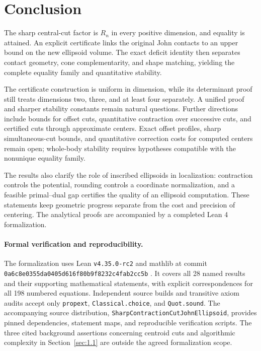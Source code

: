 \section{Conclusion}\label{sec:11}

The sharp central-cut factor is $R_n$ in every positive dimension, and equality is attained. An explicit certificate links the original John contacts to an upper bound on the new ellipsoid volume. The exact deficit identity then separates contact geometry, cone complementarity, and shape matching, yielding the complete equality family and quantitative stability.

The certificate construction is uniform in dimension, while its determinant proof still treats dimensions two, three, and at least four separately. A unified proof and sharper stability constants remain natural questions. Further directions include bounds for offset cuts, quantitative contraction over successive cuts, and certified cuts through approximate centers. Exact offset profiles, sharp simultaneous-cut bounds, and quantitative correction costs for computed centers remain open; whole-body stability requires hypotheses compatible with the nonunique equality family.

The results also clarify the role of inscribed ellipsoids in localization: contraction controls the potential, rounding controls a coordinate normalization, and a feasible primal--dual gap certifies the quality of an ellipsoid computation. These statements keep geometric progress separate from the cost and precision of centering. The analytical proofs are accompanied by a completed Lean 4 formalization.

\paragraph{Formal verification and reproducibility.}
The formalization uses Lean \texttt{v4.35.0-rc2} and mathlib at commit
\texttt{0a6c8e0355da0405d616f80b9f8232c4fab2cc5b} \cite{deMouraUllrich2021,Mathlib2020}.
It covers all 28 named results and their supporting mathematical statements,
with explicit correspondences for all 198 numbered equations. Independent
source builds and transitive axiom audits accept only \texttt{propext},
\texttt{Classical.choice}, and \texttt{Quot.sound}. The accompanying source
distribution, \texttt{SharpContractionCutJohnEllipsoid}, provides pinned
dependencies, statement maps, and reproducible verification scripts. The three
cited background assertions concerning centroid cuts and algorithmic complexity
in Section~\ref{sec:1.1} are outside the agreed formalization scope.
